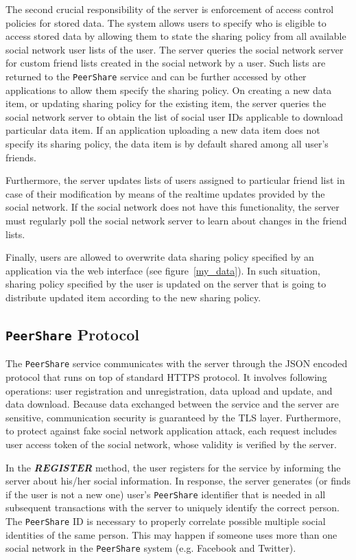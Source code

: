 \documentclass[twocolumn,a4paper,10pt]{article}
\newcommand{\peershare}{\texttt{PeerShare}\xspace}
\begin{document}
The second crucial responsibility of the server is enforcement of access control policies for stored data. The system allows users to specify who is eligible to access stored data by allowing them to state the sharing policy from all available social network user lists of the user. The server queries the social network server for custom friend lists created in the social network by a user. Such lists are returned to the \peershare service and can be further accessed by other applications to allow them specify the sharing policy. On creating a new data item, or updating sharing policy for the existing item, the server queries the social network server to obtain the list of social user IDs applicable to download particular data item. If an application uploading a new data item does not specify its sharing policy, the data item is by default shared among all user's friends.

Furthermore, the server updates lists of users assigned to particular friend list in case of their modification by means of the realtime updates provided by the social network. If the social network does not have this functionality, the server must regularly poll the social network server to learn about changes in the friend lists.

Finally, users are allowed to overwrite data sharing policy specified by an application via the web interface (see figure~\ref{my_data}). In such situation, sharing policy specified by the user is updated on the server that is going to distribute updated item according to the new sharing policy.

\subsection{\peershare Protocol}
\label{:subsec_protocols}


The \peershare service communicates with the server through the JSON encoded protocol that runs on top of standard HTTPS protocol. It involves following operations: user registration and unregistration, data upload and update, and data download. Because data exchanged between the service and the server are sensitive, communication security is guaranteed by the TLS layer. Furthermore, to protect against fake social network application attack, each request includes user access token of the social network, whose validity is verified by the server. 

In the \textbf{\emph{REGISTER}} method, the user registers for the service by informing the server about his/her social information. In response, the server generates (or finds if the user is not a new one) user's \peershare identifier that is needed in all subsequent transactions with the server to uniquely identify the correct person. The \peershare ID is necessary to properly correlate possible multiple social identities of the same person. This may happen if someone uses more than one social network in the \peershare system (e.g. Facebook and Twitter).
\end{document}
